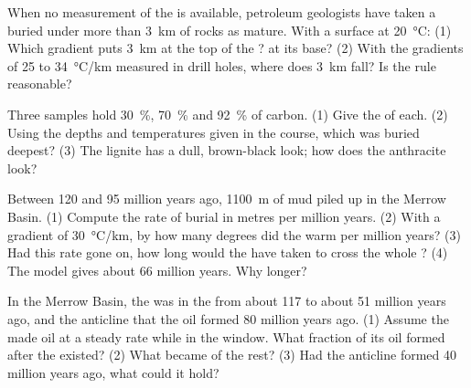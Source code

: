 \begin{exercise}[$\star\star$]\label{exo:g11:fossil-fuel-geology:10}
When no measurement of the  is available, petroleum geologists have
taken a  buried under more than \qty{3}{km} of rocks as mature.
With a surface at \qty{20}{\degreeCelsius}: (1) Which gradient puts
\qty{3}{km} at the top of the ? at its base? (2) With the
gradients of 25 to \qty{34}{\degreeCelsius/km} measured in drill holes,
where does \qty{3}{km} fall? Is the rule reasonable?
\end{exercise}

\begin{exercise}[$\star\star$]\label{exo:g11:fossil-fuel-geology:11}
Three  samples hold \qty{30}{\percent}, \qty{70}{\percent} and
\qty{92}{\percent} of carbon. (1) Give the  of each. (2) Using the
depths and temperatures given in the course, which was buried deepest?
(3) The lignite has a dull, brown-black look; how does the anthracite look?
\end{exercise}

\begin{exercise}[$\star\star\star$]\label{exo:g11:fossil-fuel-geology:12}
Between 120 and 95 million years ago, \qty{1100}{m} of mud piled up in the
Merrow Basin. (1) Compute the rate of burial in metres per million years.
(2) With a gradient of \qty{30}{\degreeCelsius/km}, by how many degrees did
the  warm per million years? (3) Had this rate gone on, how long
would the  have taken to cross the whole ? (4) The
model gives about 66 million years. Why longer?
\end{exercise}

\begin{exercise}[$\star\star\star$]\label{exo:g11:fossil-fuel-geology:13}
In the Merrow Basin, the  was in the  from about 117
to about 51 million years ago, and the anticline that  the oil formed
80 million years ago. (1) Assume the  made oil at a steady rate
while in the window. What fraction of its oil formed after the 
existed? (2) What became of the rest? (3) Had the anticline formed 40
million years ago, what could it hold?
\end{exercise}

